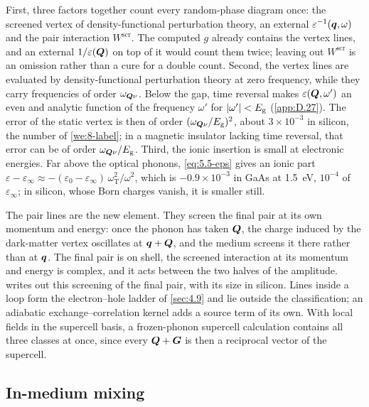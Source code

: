 First, three factors together count every random-phase diagram once: the screened vertex of density-functional perturbation theory, an external $\varepsilon^{-1}(\bm{q},\omega)$ and the pair interaction $W^{\mathrm{scr}}$. The computed $g$ already contains the vertex lines, and an external $1/\varepsilon(\bm{Q})$ on top of it would count them twice; leaving out $W^{\mathrm{scr}}$ is an omission rather than a cure for a double count. Second, the vertex lines are evaluated by density-functional perturbation theory at zero frequency, while they carry frequencies of order $\omega_{\bm{Q}\nu}$. Below the gap, time reversal makes $\varepsilon(\bm{Q},\omega')$ an even and analytic function of the frequency $\omega'$ for $|\omega'| < E_{\mathrm{g}}$ (\cref{app:D.27}). The error of the static vertex is then of order $(\omega_{\bm{Q}\nu}/E_{\mathrm{g}})^2$, about $3\times10^{-3}$ in silicon, the number of \cref{we:8-label}; in a magnetic insulator lacking time reversal, that error can be of order $\omega_{\bm{Q}\nu}/E_{\mathrm{g}}$. Third, the ionic insertion is small at electronic energies. Far above the optical phonons, \cref{eq:5.5-eps} gives an ionic part $\varepsilon - \varepsilon_\infty \approx -(\varepsilon_0 - \varepsilon_\infty)\,\omega_{\mathrm{T}}^2/\omega^2$, which is $-0.9\times10^{-3}$ in GaAs at \SI{1.5}{eV}, $10^{-4}$ of $\varepsilon_\infty$; in silicon, whose Born charges vanish, it is smaller still.

The pair lines are the new element. They screen the final pair at its own momentum and energy: once the phonon has taken $\bm{Q}$, the charge induced by the dark-matter vertex oscillates at $\bm{q} + \bm{Q}$, and the medium screens it there rather than at $\bm{q}$. The final pair is on shell, the screened interaction at its momentum and energy is complex, and it acts between the two halves of the amplitude.  writes out this screening of the final pair, with its size in silicon. Lines inside a loop form the electron--hole ladder of \cref{sec:4.9} and lie outside the classification; an adiabatic exchange--correlation kernel adds a source term of its own. With local fields in the supercell basis, a frozen-phonon supercell calculation contains all three classes at once, since every $\bm{Q} + \bm{G}$ is then a reciprocal vector of the supercell.

\subsection{In-medium mixing}\label{sec:8.4-mixing}

